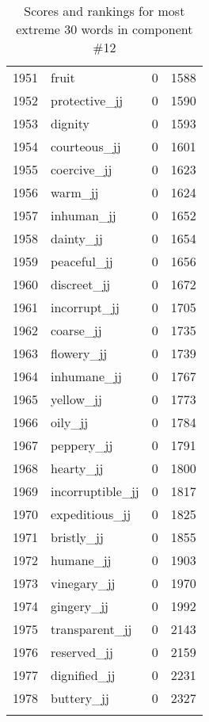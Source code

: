 \begin{longtable}[!htbp]{| rlr@{.}l |}
    1951 & fruit & 0 & 1588 \\
    1952 & protective\_jj & 0 & 1590 \\
    1953 & dignity & 0 & 1593 \\
    1954 & courteous\_jj & 0 & 1601 \\
    1955 & coercive\_jj & 0 & 1623 \\
    1956 & warm\_jj & 0 & 1624 \\
    1957 & inhuman\_jj & 0 & 1652 \\
    1958 & dainty\_jj & 0 & 1654 \\
    1959 & peaceful\_jj & 0 & 1656 \\
    1960 & discreet\_jj & 0 & 1672 \\
    1961 & incorrupt\_jj & 0 & 1705 \\
    1962 & coarse\_jj & 0 & 1735 \\
    1963 & flowery\_jj & 0 & 1739 \\
    1964 & inhumane\_jj & 0 & 1767 \\
    1965 & yellow\_jj & 0 & 1773 \\
    1966 & oily\_jj & 0 & 1784 \\
    1967 & peppery\_jj & 0 & 1791 \\
    1968 & hearty\_jj & 0 & 1800 \\
    1969 & incorruptible\_jj & 0 & 1817 \\
    1970 & expeditious\_jj & 0 & 1825 \\
    1971 & bristly\_jj & 0 & 1855 \\
    1972 & humane\_jj & 0 & 1903 \\
    1973 & vinegary\_jj & 0 & 1970 \\
    1974 & gingery\_jj & 0 & 1992 \\
    1975 & transparent\_jj & 0 & 2143 \\
    1976 & reserved\_jj & 0 & 2159 \\
    1977 & dignified\_jj & 0 & 2231 \\
    1978 & buttery\_jj & 0 & 2327 \\
    \hline
    \caption{Scores and rankings for most extreme 30 words in component \#12} \\
\end{longtable}
